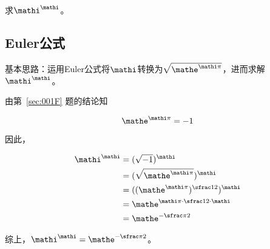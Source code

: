 

求$\mathi^\mathi$。


\subsection{Euler公式}

基本思路：运用Euler公式将$\mathi$转换为$\sqrt{\mathe^{\mathi\pi}}$，进而求解$\mathi^\mathi$。

由第~\ref{sec:001F} 题的结论知

\[ \mathe^{\mathi\pi} = -1 \]

因此，

\begin{align*}
  \mathi^\mathi &= (\sqrt{-1})^\mathi \\
  &= (\sqrt{\mathe^{\mathi\pi}})^{\mathi} \\
  &= ((\mathe^{\mathi\pi})^{\sfrac12})^{\mathi} \\
  &= \mathe^{\mathi\pi\cdot\sfrac12\cdot\mathi} \\
  &= \mathe^{-\sfrac\pi2} \\
\end{align*}

综上，$\mathi^\mathi = \mathe^{-\sfrac\pi2}$。
